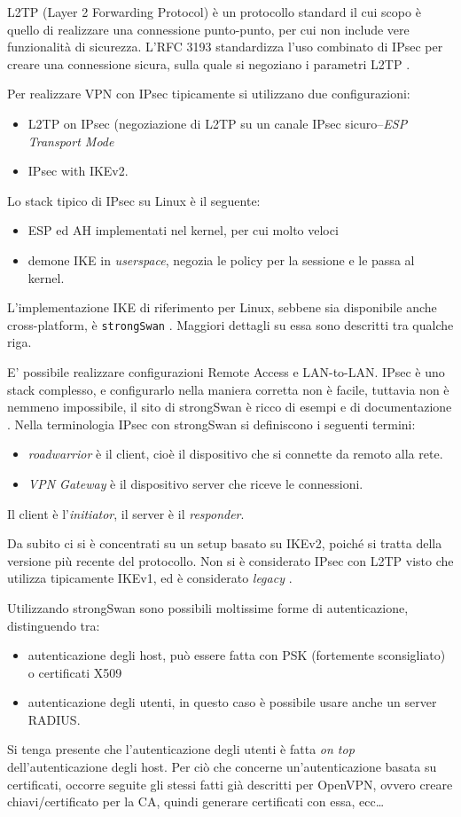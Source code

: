 L2TP (Layer 2 Forwarding Protocol) è un protocollo standard il cui scopo è quello
di realizzare una connessione punto-punto, per cui non include vere funzionalità
di sicurezza. L'RFC 3193 standardizza l'uso combinato di IPsec per creare una
connessione sicura, sulla quale si negoziano
i parametri L2TP \cite{RFC3193}.


Per realizzare VPN con IPsec tipicamente si utilizzano due configurazioni:
\begin{itemize}
  \item L2TP on IPsec (negoziazione di L2TP su un canale IPsec sicuro--\textit{ESP Transport Mode}
  \item IPsec with IKEv2.
\end{itemize}


Lo stack tipico di IPsec su Linux è il seguente:
\begin{itemize}
  \item ESP ed AH implementati nel kernel, per cui molto veloci
  \item demone IKE in \textit{userspace}, negozia le policy per la sessione e le
  passa al kernel.
\end{itemize}
L'implementazione IKE di riferimento per Linux, sebbene sia disponibile anche
cross-platform, è \texttt{strongSwan} \cite{strongswan}. Maggiori dettagli su essa sono descritti
tra qualche riga.


E' possibile realizzare configurazioni Remote Access e LAN-to-LAN. IPsec è uno stack
complesso, e configurarlo nella maniera corretta non è facile, tuttavia non è nemmeno
impossibile, il sito di strongSwan è ricco di esempi e di documentazione \cite{strongswan-example}.
Nella terminologia IPsec con strongSwan si definiscono i seguenti termini:
\begin{itemize}
  \item \textit{roadwarrior} è il client, cioè il dispositivo che si connette da remoto alla rete.
  \item \textit{VPN Gateway} è il dispositivo server che riceve le connessioni.
\end{itemize}
Il client è l'\textit{initiator},
il server è il \textit{responder}.

Da subito ci si è concentrati su un setup basato su IKEv2, poiché si tratta della
versione più recente del protocollo. Non si è considerato IPsec con L2TP
visto che utilizza tipicamente IKEv1, ed è considerato \textit{legacy} \cite{nordvpn}.

Utilizzando strongSwan sono possibili moltissime forme di autenticazione, distinguendo tra:
\begin{itemize}
  \item autenticazione degli host, può essere fatta con PSK (fortemente sconsigliato) o certificati X509
  \item autenticazione degli utenti, in questo caso è possibile usare anche un
  server RADIUS.
\end{itemize}
Si tenga presente che l'autenticazione degli utenti è fatta \textit{on top} dell'autenticazione
degli host.
Per ciò che concerne un'autenticazione basata su certificati, occorre seguite gli stessi
fatti già descritti per OpenVPN, ovvero creare chiavi/certificato per la CA, quindi generare
certificati con essa, ecc\ldots


